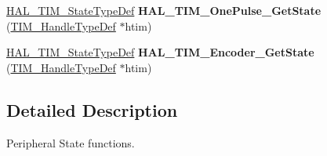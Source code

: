 \begin{DoxyCompactItemize}
\item 
\mbox{\label{group___t_i_m___exported___functions___group10_gab66fcfc1ee00512f50ef56f4397a0e9f}} 
\hyperlink{group___t_i_m___exported___types_gae0994cf5970e56ca4903e9151f40010c}{H\+A\+L\+\_\+\+T\+I\+M\+\_\+\+State\+Type\+Def} {\bfseries H\+A\+L\+\_\+\+T\+I\+M\+\_\+\+One\+Pulse\+\_\+\+Get\+State} (\hyperlink{struct_t_i_m___handle_type_def}{T\+I\+M\+\_\+\+Handle\+Type\+Def} $\ast$htim)
\item 
\mbox{\label{group___t_i_m___exported___functions___group10_ga1925971e419b85db7fed57919ba765ef}} 
\hyperlink{group___t_i_m___exported___types_gae0994cf5970e56ca4903e9151f40010c}{H\+A\+L\+\_\+\+T\+I\+M\+\_\+\+State\+Type\+Def} {\bfseries H\+A\+L\+\_\+\+T\+I\+M\+\_\+\+Encoder\+\_\+\+Get\+State} (\hyperlink{struct_t_i_m___handle_type_def}{T\+I\+M\+\_\+\+Handle\+Type\+Def} $\ast$htim)
\end{DoxyCompactItemize}


\subsection{Detailed Description}
Peripheral State functions. 

